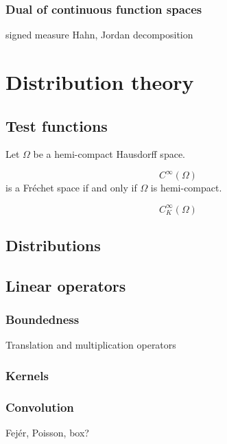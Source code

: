 \documentclass{../../large}
\begin{document}
\section{Dual of continuous function spaces}

signed measure
Hahn, Jordan decomposition







\part{Distribution theory}
\chapter{Test functions}

Let $\Omega$ be a hemi-compact Hausdorff space.

\[C^\infty(\Omega)\]
is a Fr\'echet space if and only if $\Omega$ is hemi-compact.

\[C_K^\infty(\Omega)\]

\chapter{Distributions}


\chapter{Linear operators}

\section{Boundedness}

Translation and multiplication operators

\begin{prb}
\end{prb}


\section{Kernels}
\begin{prb}
\end{prb}
\begin{prb}
\end{prb}

\section{Convolution}
\begin{prb}
Fej\'er, Poisson, box?
\end{prb}
\begin{prb}
\end{prb}
\end{document}
